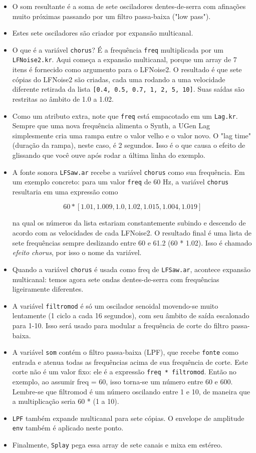 \begin{itemize}
\item O som resultante é a soma de sete osciladores dentes-de-serra com afinações muito próximas passando por um filtro passa-baixa ("low pass").
\item Estes sete osciladores são criador por expansão multicanal.
\item O que é a variável \texttt{chorus}? É a frequência \texttt{freq} multiplicada por um \texttt{LFNoise2.kr}. Aqui começa a expansão multicanal, porque um array de 7 itens é fornecido como argumento para o LFNoise2. O resultado é que sete cópias do LFNoise2 são criadas, cada uma rodando a uma velocidade diferente retirada da lista \texttt{[0.4, 0.5, 0.7, 1, 2, 5, 10]}. Suas saídas são restritas ao âmbito de 1.0 a 1.02.
\item Como um atributo extra, note que \texttt{freq} está empacotado em um \texttt{Lag.kr}. Sempre que uma nova frequência alimenta o Synth, a UGen Lag simplesmente cria uma rampa entre o valor velho e o valor novo. O "lag time" (duração da rampa), neste caso, é 2 segundos. Isso é o que causa o efeito de glissando que você ouve após rodar a última linha do exemplo.  
\item A fonte sonora \texttt{LFSaw.ar} recebe a variável \texttt{chorus} como sua frequência. Em um exemplo concreto: para um valor \texttt{freq} de 60 Hz, a variável \texttt{chorus} resultaria em uma expressão como

$$60 * [1.01, 1.009, 1.0, 1.02, 1.015, 1.004, 1.019]$$

na qual os números da lista estariam constantemente subindo e descendo de acordo com as velocidades de cada LFNoise2. O resultado final é uma lista de sete frequências sempre deslizando entre 60 e 61.2 (60 * 1.02). Isso é chamado \textit{efeito chorus}, por isso o nome da variável. 
\item Quando a variável \texttt{chorus} é usada como freq de \texttt{LFSaw.ar}, acontece expansão multicanal: temos agora sete ondas dentes-de-serra com frequências ligeiramente diferentes.
\item A variável \texttt{filtromod} é só um oscilador senoidal movendo-se muito lentamente (1 ciclo a cada 16 segundos), com seu âmbito de saída escalonado para 1-10. Isso será usado para modular a frequência de corte do filtro passa-baixa.
\item A variável \texttt{som} contém o filtro passa-baixa (LPF), que recebe \texttt{fonte} como entrada e atenua todas as frequências acima de sua frequência de corte. Este corte não é um valor fixo: ele é a expressão \texttt{freq * filtromod}. Então no exemplo, ao assumir freq = 60, isso torna-se um número entre 60 e 600. Lembre-se que filtromod é um número oscilando entre 1 e 10, de maneira que a multiplicação seria 60 * (1 a 10).
\item \texttt{LPF} também expande multicanal para sete cópias. O envelope de amplitude \texttt{env} também é aplicado neste ponto.
\item Finalmente, \texttt{Splay} pega essa array de sete canais e mixa em estéreo.

\end{itemize}
 
